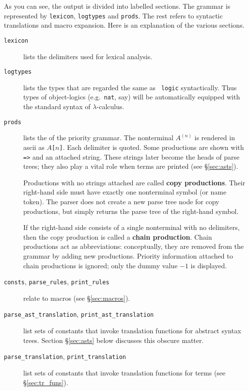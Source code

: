 As you can see, the output is divided into labelled sections.  The grammar
is represented by {\tt lexicon}, {\tt logtypes} and {\tt prods}.  The rest
refers to syntactic translations and macro expansion.  Here is an
explanation of the various sections.
\begin{description}
  \item[{\tt lexicon}] lists the delimiters used for lexical
    analysis.

  \item[{\tt logtypes}] lists the types that are regarded the same as {\tt
    logic} syntactically. Thus types of object-logics (e.g.\ {\tt nat}, say)
    will be automatically equipped with the standard syntax of
    $\lambda$-calculus.

  \item[{\tt prods}] lists the  of the priority grammar.
    The nonterminal $A^{(n)}$ is rendered in {\sc ascii} as {\tt $A$[$n$]}.
    Each delimiter is quoted.  Some productions are shown with {\tt =>} and
    an attached string.  These strings later become the heads of parse
    trees; they also play a vital role when terms are printed (see
    \S\ref{sec:asts}).

    Productions with no strings attached are called {\bf copy
      productions}.  Their right-hand side must
    have exactly one nonterminal symbol (or name token).  The parser does
    not create a new parse tree node for copy productions, but simply
    returns the parse tree of the right-hand symbol.

    If the right-hand side consists of a single nonterminal with no
    delimiters, then the copy production is called a {\bf chain
      production}.  Chain productions act as abbreviations:
    conceptually, they are removed from the grammar by adding new
    productions.  Priority information attached to chain productions is
    ignored; only the dummy value $-1$ is displayed.

  \item[{\tt consts}, {\tt parse_rules}, {\tt print_rules}]
    relate to macros (see \S\ref{sec:macros}).

  \item[{\tt parse_ast_translation}, {\tt print_ast_translation}]
    list sets of constants that invoke translation functions for abstract
    syntax trees.  Section \S\ref{sec:asts} below discusses this obscure
    matter.

  \item[{\tt parse_translation}, {\tt print_translation}] list sets
    of constants that invoke translation functions for terms (see
    \S\ref{sec:tr_funs}).
\end{description}



